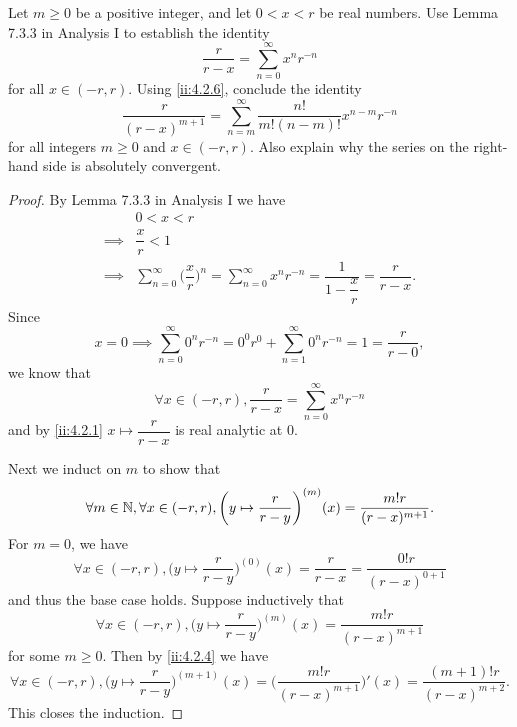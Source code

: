 \begin{ex}\label{ii:ex:4.2.7}
  Let \(m \geq 0\) be a positive integer, and let \(0 < x < r\) be real numbers.
  Use Lemma 7.3.3 in Analysis I to establish the identity
  \[
    \dfrac{r}{r - x} = \sum_{n = 0}^\infty x^n r^{-n}
  \]
  for all \(x \in (-r, r)\).
  Using \cref{ii:4.2.6}, conclude the identity
  \[
    \dfrac{r}{(r - x)^{m + 1}} = \sum_{n = m}^\infty \dfrac{n!}{m! (n - m)!} x^{n - m} r^{-n}
  \]
  for all integers \(m \geq 0\) and \(x \in (-r, r)\).
  Also explain why the series on the right-hand side is absolutely convergent.
\end{ex}

\begin{proof}
  By Lemma 7.3.3 in Analysis I we have
  \begin{align*}
             & 0 < x < r                                                                                                                         \\
    \implies & \dfrac{x}{r} < 1                                                                                                                  \\
    \implies & \sum_{n = 0}^\infty \bigg(\dfrac{x}{r}\bigg)^n = \sum_{n = 0}^\infty x^n r^{-n} = \dfrac{1}{1 - \dfrac{x}{r}} = \dfrac{r}{r - x}.
  \end{align*}
  Since
  \[
    x = 0 \implies \sum_{n = 0}^\infty 0^n r^{-n} = 0^0 r^{0} + \sum_{n = 1}^\infty 0^n r^{-n} = 1 = \dfrac{r}{r - 0},
  \]
  we know that
  \[
    \forall x \in (-r, r), \dfrac{r}{r - x} = \sum_{n = 0}^\infty x^n r^{-n}
  \]
  and by \cref{ii:4.2.1} \(x \mapsto \dfrac{r}{r - x}\) is real analytic at \(0\).

  Next we induct on \(m\) to show that
  \[
    \forall m \in \mathbb{N}, \forall x \in (-r, r), \bigg(y \mapsto \dfrac{r}{r - y}\bigg)^{(m)}(x) = \dfrac{m! r}{(r - x)^{m + 1}}.
  \]
  For \(m = 0\), we have
  \[
    \forall x \in (-r, r), \bigg(y \mapsto \dfrac{r}{r - y}\bigg)^{(0)}(x) = \dfrac{r}{r - x} = \dfrac{0! r}{(r - x)^{0 + 1}}
  \]
  and thus the base case holds.
  Suppose inductively that
  \[
    \forall x \in (-r, r), \bigg(y \mapsto \dfrac{r}{r - y}\bigg)^{(m)}(x) = \dfrac{m! r}{(r - x)^{m + 1}}
  \]
  for some \(m \geq 0\).
  Then by \cref{ii:4.2.4} we have
  \[
    \forall x \in (-r, r), \bigg(y \mapsto \dfrac{r}{r - y}\bigg)^{(m + 1)}(x) = \bigg(\dfrac{m! r}{(r - x)^{m + 1}}\bigg)'(x) = \dfrac{(m + 1)! r}{(r - x)^{m + 2}}.
  \]
  This closes the induction.


\end{proof}
